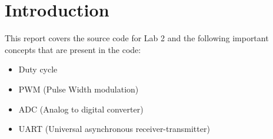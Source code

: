 \section{Introduction}
\label{section:intro}
This report covers the source code for Lab 2 and the following important concepts that are present in the code:
\begin{itemize}
    \item Duty cycle
    \item PWM (Pulse Width modulation)
    \item ADC (Analog to digital converter) 
    \item UART (Universal asynchronous receiver-transmitter)
\end{itemize}









